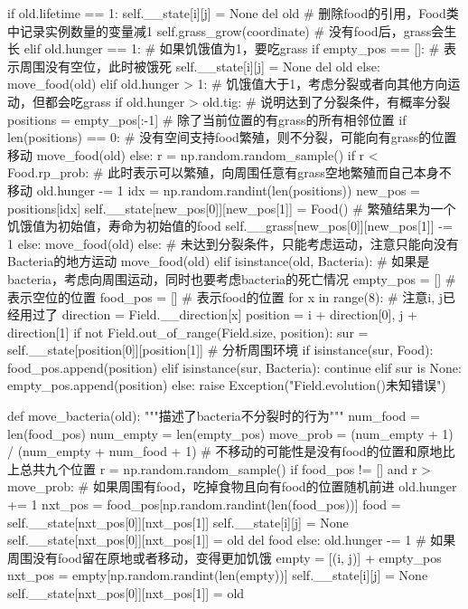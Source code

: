 \documentclass[a4paper]{ctexart}
\begin{document}
\begin{python}
				if old.lifetime == 1:
					self.__state[i][j] = None
					del old  # 删除food的引用，Food类中记录实例数量的变量减1
					self.grass_grow(coordinate)  # 没有food后，grass会生长
				elif old.hunger == 1:  # 如果饥饿值为1，要吃grass
					if empty_pos == []:  # 表示周围没有空位，此时被饿死
						self.__state[i][j] = None
						del old
					else:
						move_food(old)
				elif old.hunger > 1:  # 饥饿值大于1，考虑分裂或者向其他方向运动，但都会吃grass
					if old.hunger > old.tig:  # 说明达到了分裂条件，有概率分裂
						positions = empty_pos[:-1]  # 除了当前位置的有grass的所有相邻位置
						if len(positions) == 0:  # 没有空间支持food繁殖，则不分裂，可能向有grass的位置移动
							move_food(old)
						else:
							r = np.random.random_sample()
							if r < Food.rp_prob:  # 此时表示可以繁殖，向周围任意有grass空地繁殖而自己本身不移动
								old.hunger -= 1
								idx = np.random.randint(len(positions))
								new_pos = positions[idx]
								self.__state[new_pos[0]][new_pos[1]] = Food()
								# 繁殖结果为一个饥饿值为初始值，寿命为初始值的food
								self.__grass[new_pos[0]][new_pos[1]] -= 1
							else:
								move_food(old)
					else:  # 未达到分裂条件，只能考虑运动，注意只能向没有Bacteria的地方运动
						move_food(old)
			elif isinstance(old, Bacteria):
				# 如果是bacteria，考虑向周围运动，同时也要考虑bacteria的死亡情况
				empty_pos = []  # 表示空位的位置
				food_pos = []  # 表示food的位置
				for x in range(8):  # 注意i, j已经用过了
					direction = Field.__direction[x]
					position = i + direction[0], j + direction[1]
					if not Field.out_of_range(Field.size, position):
						sur = self.__state[position[0]][position[1]]
						# 分析周围环境
						if isinstance(sur, Food):
							food_pos.append(position)
						elif isinstance(sur, Bacteria):
							continue
						elif sur is None:
							empty_pos.append(position)
						else:
							raise Exception("Field.evolution()未知错误")
	
				def move_bacteria(old):
					"""描述了bacteria不分裂时的行为"""
					num_food = len(food_pos)
					num_empty = len(empty_pos)
					move_prob = (num_empty + 1) / (num_empty + num_food + 1) # 不移动的可能性是没有food的位置和原地比上总共九个位置
					r = np.random.random_sample()
					if food_pos != [] and r > move_prob:  # 如果周围有food，吃掉食物且向有food的位置随机前进
						old.hunger += 1
						nxt_pos = food_pos[np.random.randint(len(food_pos))]
						food = self.__state[nxt_pos[0]][nxt_pos[1]]
						self.__state[i][j] = None
						self.__state[nxt_pos[0]][nxt_pos[1]] = old
						del food
					else:
						old.hunger -= 1  # 如果周围没有food留在原地或者移动，变得更加饥饿
						empty = [(i, j)] + empty_pos
						nxt_pos = empty[np.random.randint(len(empty))]
						self.__state[i][j] = None
						self.__state[nxt_pos[0]][nxt_pos[1]] = old
	

\end{python}
\end{document}
